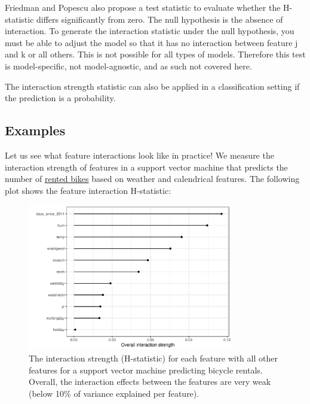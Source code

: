 \documentclass[
  11pt,
]{scrbook}
\begin{document}
Friedman and Popescu also propose a test statistic to evaluate whether the H-statistic differs significantly from zero.
The null hypothesis is the absence of interaction.
To generate the interaction statistic under the null hypothesis, you must be able to adjust the model so that it has no interaction between feature j and k or all others.
This is not possible for all types of models.
Therefore this test is model-specific, not model-agnostic, and as such not covered here.

The interaction strength statistic can also be applied in a classification setting if the prediction is a probability.

\hypertarget{examples-2}{%
\subsection{Examples}\label{examples-2}}

Let us see what feature interactions look like in practice!
We measure the interaction strength of features in a support vector machine that predicts the number of \protect\hyperlink{bike-data}{rented bikes} based on weather and calendrical features.
The following plot shows the feature interaction H-statistic:

\begin{figure}

{\centering \includegraphics[width=0.8\textwidth]{images/interaction-bike-1} 

}

\caption{The interaction strength (H-statistic) for each feature with all other features for a support vector machine predicting bicycle rentals. Overall, the interaction effects between the features are very weak (below 10\% of variance explained per feature).}\label{fig:interaction-bike}
\end{figure}
\end{document}
